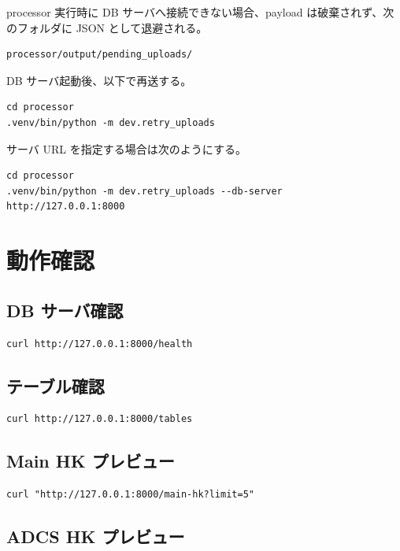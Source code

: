 \documentclass[a4paper,11pt]{ltjsarticle}
\begin{document}
processor 実行時に DB サーバへ接続できない場合、payload は破棄されず、次のフォルダに JSON として退避される。

\begin{verbatim}
processor/output/pending_uploads/
\end{verbatim}

DB サーバ起動後、以下で再送する。

\begin{verbatim}
cd processor
.venv/bin/python -m dev.retry_uploads
\end{verbatim}

サーバ URL を指定する場合は次のようにする。

\begin{verbatim}
cd processor
.venv/bin/python -m dev.retry_uploads --db-server http://127.0.0.1:8000
\end{verbatim}

\section{動作確認}

\subsection{DB サーバ確認}

\begin{verbatim}
curl http://127.0.0.1:8000/health
\end{verbatim}

\subsection{テーブル確認}

\begin{verbatim}
curl http://127.0.0.1:8000/tables
\end{verbatim}

\subsection{Main HK プレビュー}

\begin{verbatim}
curl "http://127.0.0.1:8000/main-hk?limit=5"
\end{verbatim}

\subsection{ADCS HK プレビュー}
\end{document}
